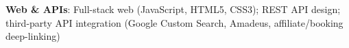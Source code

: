\item \textbf{Web \& APIs}: Full-stack web (JavaScript, HTML5, CSS3); REST API design; third-party API integration (Google Custom Search, Amadeus, affiliate/booking deep-linking)
